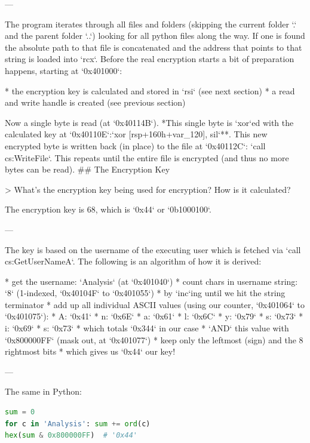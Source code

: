 \begin{markdown}
---

\noindent The program iterates through all files and folders (skipping the current folder `.` and the parent folder `..`) looking for all python files along the way.  If one is found the absolute path to that file is concatenated and the address that points to that string is loaded into `rcx`. 
\n
Before the real encryption starts a bit of preparation happens, starting at `0x401000`:\s

* the encryption key is calculated and stored in `rsi` (see next section)
* a read and write handle is created (see previous section)

\noindent\s Now a single byte is read (at `0x40114B`).
\n 
\noindent **This single byte is `xor`ed with the calculated key at `0x40110E`:\s `xor     [rsp+160h+var_120], sil`**.
\n
This new encrypted byte is written back (in place) to the file at `0x40112C`:\s
`call    cs:WriteFile`.
\n
This repeats until the entire file is encrypted (and thus no more bytes can be read).
## The Encryption Key

> \noindent What's the encryption key being used for encryption? How is it calculated? 

The encryption key is 68, which is `0x44` or `0b1000100`.

---

\noindent The key is based on the username of the executing user which is fetched  via `call cs:GetUserNameA`.
\n
The following is an algorithm of how it is derived:\s

* get the username: `Analysis` (at `0x401040`)
* count chars in username string: `8` (1-indexed, `0x40104F` to `0x401055`)
    * by `inc`ing until we hit the string terminator
* add up all individual ASCII values (using our counter, `0x401064` to `0x401075`):
    * A: `0x41`
    * n: `0x6E`
    * a: `0x61`
    * l: `0x6C`
    * y: `0x79`
    * s: `0x73`
    * i: `0x69`
    * s: `0x73`
* which totals `0x344` in our case
* `AND` this value with `0x800000FF` (mask out, at `0x401077`)
    * keep only the leftmost (sign) and the 8 rightmost bits
* which gives us `0x44` our key!

---

The same in Python:

\end{markdown}
\begin{lstlisting}[language=python,name={key_calculator.py},label={keycalc}]
sum = 0
for c in 'Analysis': sum += ord(c)
hex(sum & 0x800000FF)  # '0x44'
\end{lstlisting}
